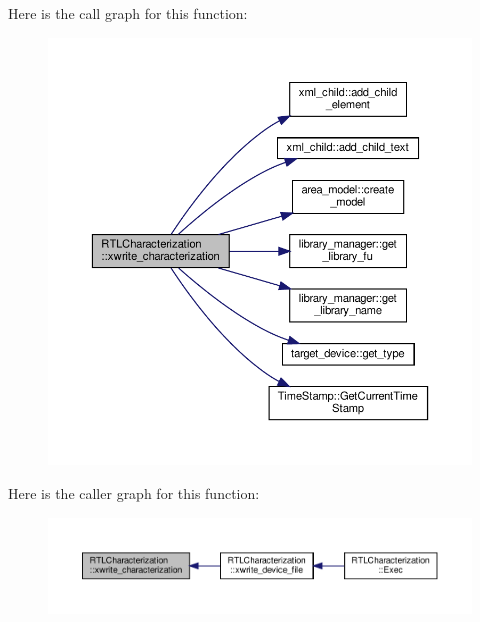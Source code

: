 Here is the call graph for this function\+:
\nopagebreak
\begin{figure}[H]
\begin{center}
\leavevmode
\includegraphics[width=350pt]{d9/d84/classRTLCharacterization_a45858c1c48c467edd0a7eb04d27a478b_cgraph}
\end{center}
\end{figure}
Here is the caller graph for this function\+:
\nopagebreak
\begin{figure}[H]
\begin{center}
\leavevmode
\includegraphics[width=350pt]{d9/d84/classRTLCharacterization_a45858c1c48c467edd0a7eb04d27a478b_icgraph}
\end{center}
\end{figure}
\mbox{\label{classRTLCharacterization_a2478484e956bec25a282ede5faaeaa88}} 
